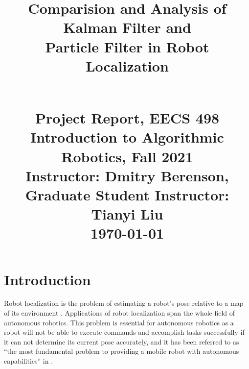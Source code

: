 \documentclass[conference,onecolumn]{IEEEtran}
\begin{document}
\title{Comparision and Analysis of Kalman Filter and \\ Particle Filter in Robot Localization \\

\author{
\and
{}



}\\

{\normalsize Project Report, EECS 498 Introduction to Algorithmic Robotics, Fall 2021}\\
{\normalsize Instructor: Dmitry Berenson, Graduate Student Instructor: Tianyi Liu}\\
{\normalsize {\AdvanceDate[-1]\today} }
}
\maketitle




\section{Introduction}


Robot localization is the problem of estimating a robot’s pose relative to a map of its environment \cite{DBLP:books/sp/01/FoxTBD01, DBLP:journals/trob/BetkeG97}.
Applications of robot localization span the whole field of autonomous robotics. This problem is essential for autonomous robotics as a robot will not be able to execute commands and accomplish tasks successfully if it can not determine its current pose accurately, and it has been referred to as “the most fundamental problem to providing a mobile robot with autonomous capabilities” in \cite{DBLP:journals/trob/Cox91}. 
\end{document}
